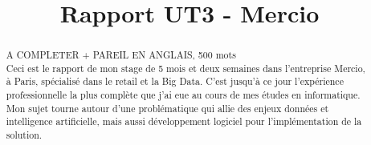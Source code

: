 \documentclass{rapportCS}
\title{Rapport UT3 - Mercio} %
\begin{document}








        
\fairemarges %
\fairepagedegarde %

\begin{center}
	\begin{abstract}
A COMPLETER + PAREIL EN ANGLAIS, 500 mots \\

Ceci est le rapport de mon stage de 5 mois et deux semaines dans l'entreprise Mercio, à Paris,
spécialisé dans le retail et la Big Data.
C'est jusqu'à ce jour l'expérience professionnelle la plus complète que j'ai eue au cours de mes 
études en informatique. \\
Mon sujet tourne autour d'une problématique qui allie des enjeux données et intelligence 
artificielle, mais aussi développement logiciel pour l'implémentation de la solution.
    \end{abstract}
\end{center}
\newpage

\end{document}
